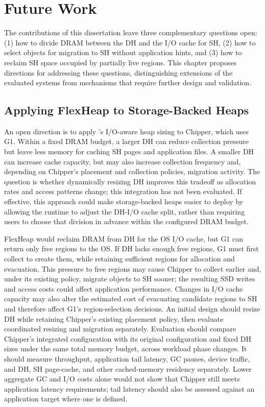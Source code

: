 \chapter{Future Work}
\label{chapter:future_work}

The contributions of this dissertation leave three complementary questions open: (1) how to divide DRAM between the DH and the I/O cache for SH, (2) how to select objects for migration to SH without application hints, and (3) how to reclaim SH space occupied by partially live regions.
This chapter proposes directions for addressing these questions, distinguishing extensions of the evaluated systems from mechanisms that require further design and validation.

\section{Applying FlexHeap to Storage-Backed Heaps}
\label{sec:future_flexheap}

An open direction is to apply \flexheapName{}'s I/O-aware heap sizing to Chipper, which uses G1.
Within a fixed DRAM budget, a larger DH can reduce collection pressure but leave less memory for caching SH pages and application files.
A smaller DH can increase cache capacity, but may also increase collection frequency and, depending on Chipper's placement and collection policies, migration activity.
The question is whether dynamically resizing DH improves this tradeoff as allocation rates and access patterns change; this integration has not been evaluated.
If effective, this approach could make storage-backed heaps easier to deploy by allowing the runtime to adjust the DH-I/O cache split, rather than requiring users to choose that division in advance within the configured DRAM budget.

FlexHeap would reclaim DRAM from DH for the OS I/O cache, but G1 can return only free regions to the OS.
If DH lacks enough free regions, G1 must first collect to create them, while retaining sufficient regions for allocation and evacuation.
This pressure to free regions may cause Chipper to collect earlier and, under its existing policy, migrate objects to SH sooner; the resulting SSD writes and access costs could affect application performance.
Changes in I/O cache capacity may also alter the estimated cost of evacuating candidate regions to SH and therefore affect G1's region-selection decisions.
An initial design should resize DH while retaining Chipper's existing placement policy, then evaluate coordinated resizing and migration separately.
Evaluation should compare Chipper's integrated configuration with its original configuration and fixed DH sizes under the same total memory budget, across workload phase changes.
It should measure throughput, application tail latency, GC pauses, device traffic, and DH, SH page-cache, and other cached-memory residency separately.
Lower aggregate GC and I/O costs alone would not show that Chipper still meets application latency requirements; tail latency should also be assessed against an application target where one is defined.

